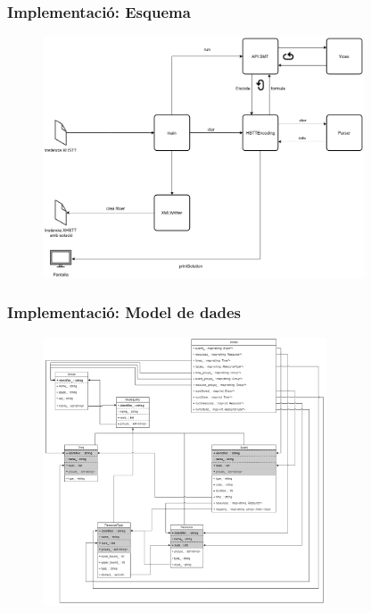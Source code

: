 \documentclass[11pt]{beamer}
\begin{document}
  \begin{frame}
  \frametitle{Implementació: Esquema}
    \begin{figure}[p]
      \includegraphics[width=0.85\textwidth]{Diagrames/Arqui2.png}
      \label{fig:procs}
    \end{figure}
  \end{frame}

  \begin{frame}
    \frametitle{Implementació: Model de dades}
    \begin{figure}[p]
      \includegraphics[width=0.75\textwidth]{Diagrames/ModelDades.png}
      \label{fig:procs}
    \end{figure}
  \end{frame}
\end{document}
